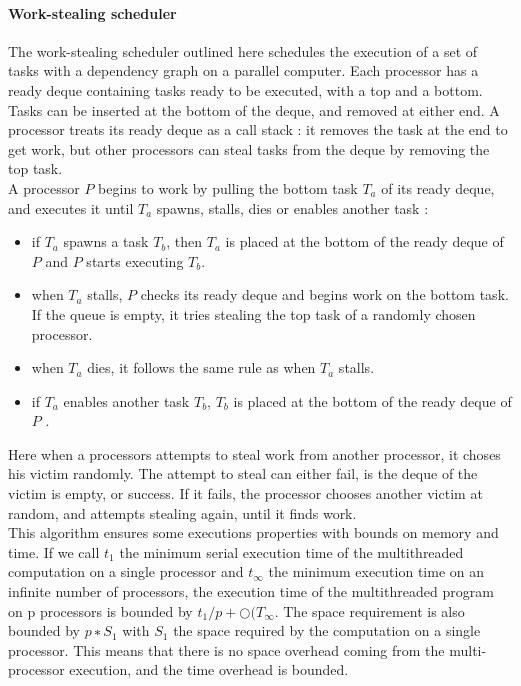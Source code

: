 \documentclass[a4paper,11pt]{article}
\begin{document}
\paragraph{Work-stealing scheduler} The work-stealing scheduler outlined here schedules the execution
of a set of tasks with a dependency graph on a parallel computer. Each processor
has a ready deque containing tasks ready to be executed, with a top and a bottom. Tasks
can be inserted at the bottom of the deque, and removed at either end. A processor treats
its ready deque as a call stack : it removes the task at the end to get work, but other
processors can steal tasks from the deque by removing the top task. \\
A processor $P$ begins to work by pulling the bottom task $T_a$ of its ready deque, and
executes it until $T_a$ spawns, stalls, dies or enables another task :
\begin{itemize}
 \item if $T_a$ spawns a task $T_b$, then $T_a$ is placed at the bottom of the ready deque of $P$
  and $P$ starts executing $T_b$.
  \item  when $T_a$ stalls, $P$ checks its ready deque and begins work on the bottom task. If
  the queue is empty, it tries stealing the top task of a randomly chosen processor.
  \item  when $T_a$ dies, it follows the same rule as when $T_a$ stalls.
  \item  if $T_a$ enables another task $T_b$, $T_b$ is placed at the bottom of the ready deque of $P$ .
\end{itemize}
Here when a processors attempts to steal work from another processor, it choses his victim
randomly. The attempt to steal can either fail, is the deque of the victim is empty, or
success. If it fails, the processor chooses another victim at random, and attempts stealing
again, until it finds work. \\
This algorithm ensures some executions properties with bounds on memory and time. If
we call $t_1$ the minimum serial execution time of the multithreaded computation on a single
processor and $t_{\infty}$ the minimum execution time on an infinite number of processors, the execution 
time of the multithreaded program on p processors is bounded by $t_1/p + \bigcirc (T_{\infty}$.
The space requirement is also bounded by $p ∗ S_1$ with $S_1$ the space required by the computation 
on a single processor. This means that there is no space overhead coming from
the multi-processor execution, and the time overhead is bounded.
\end{document}
